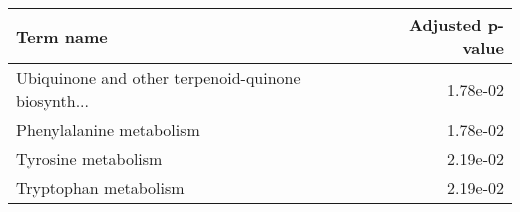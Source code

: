 \begin{tabular}{lr}
\toprule
                                         Term name &  Adjusted p-value \\
\midrule
Ubiquinone and other terpenoid-quinone biosynth... &          1.78e-02 \\
                          Phenylalanine metabolism &          1.78e-02 \\
                               Tyrosine metabolism &          2.19e-02 \\
                             Tryptophan metabolism &          2.19e-02 \\
\bottomrule
\end{tabular}
